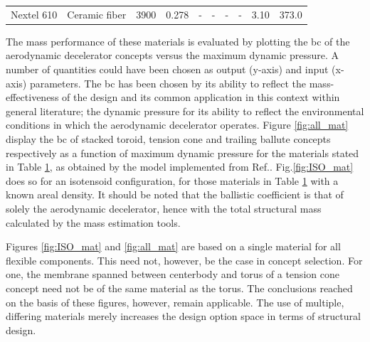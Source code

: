 \begin{table}[H]
\begin{tabular}{p{}|p{}|p{}|p{}|p{}|p{}|p{}|p{}|p{}|p{}}
Nextel 610                   & Ceramic fiber                & 3900                                 & 0.278                                     & -                            & -                                & -                          & -                                & 3.10                       & 373.0                                       
\label{table:strucmatoverview}
\end{tabular}
\end{table}

The mass performance of these materials is evaluated by plotting the \acrfull{bc} of the aerodynamic decelerator concepts versus the maximum dynamic pressure. A number of quantities could have been chosen as output (y-axis) and input (x-axis) parameters. The \gls{bc} has been chosen by its ability to reflect the mass-effectiveness of the design and its common application in this context within general literature; the dynamic pressure for its ability to reflect the environmental conditions in which the aerodynamic decelerator operates. Figure \ref{fig:all_mat} display the \gls{bc} of stacked toroid, tension cone and trailing ballute concepts respectively as a function of maximum dynamic pressure for the materials stated in Table \ref{table:strucmatoverview}, as obtained by the model implemented from Ref.\cite{Samareh2011}. Fig.\ref{fig:ISO_mat} does so for an isotensoid configuration, for those materials in Table \ref{table:strucmatoverview} with a known areal density. It should be noted that the ballistic coefficient is that of solely the aerodynamic decelerator, hence with the total structural mass calculated by the mass estimation tools.

Figures \ref{fig:ISO_mat} and \ref{fig:all_mat} are based on a single material for all flexible components. This need not, however, be the case in concept selection. For one, the membrane spanned between centerbody and torus of a tension cone concept need not be of the same material as the torus. The conclusions reached on the basis of these figures, however, remain applicable. The use of multiple, differing materials merely increases the design option space in terms of structural design.

